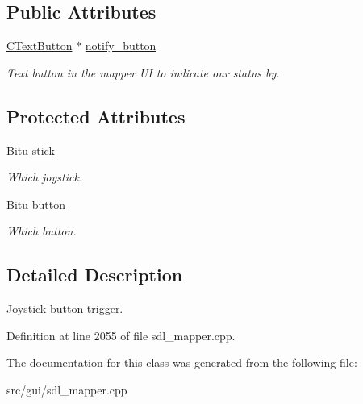 \subsection*{Public Attributes}
\begin{DoxyCompactItemize}
\item 
\hypertarget{classCJButtonEvent_ac8c89511fdc9a86b4c187eec432445d2}{\hyperlink{classCTextButton}{C\-Text\-Button} $\ast$ \hyperlink{classCJButtonEvent_ac8c89511fdc9a86b4c187eec432445d2}{notify\-\_\-button}}\label{classCJButtonEvent_ac8c89511fdc9a86b4c187eec432445d2}

\begin{DoxyCompactList}\small\item\em Text button in the mapper U\-I to indicate our status by. \end{DoxyCompactList}\end{DoxyCompactItemize}
\subsection*{Protected Attributes}
\begin{DoxyCompactItemize}
\item 
\hypertarget{classCJButtonEvent_aa87062af5d8bc5db801066e2eb4a74f8}{Bitu \hyperlink{classCJButtonEvent_aa87062af5d8bc5db801066e2eb4a74f8}{stick}}\label{classCJButtonEvent_aa87062af5d8bc5db801066e2eb4a74f8}

\begin{DoxyCompactList}\small\item\em Which joystick. \end{DoxyCompactList}\item 
\hypertarget{classCJButtonEvent_abdbfaa23915b89b1392129c9525dd58d}{Bitu \hyperlink{classCJButtonEvent_abdbfaa23915b89b1392129c9525dd58d}{button}}\label{classCJButtonEvent_abdbfaa23915b89b1392129c9525dd58d}

\begin{DoxyCompactList}\small\item\em Which button. \end{DoxyCompactList}\end{DoxyCompactItemize}


\subsection{Detailed Description}
Joystick button trigger. 

Definition at line 2055 of file sdl\-\_\-mapper.\-cpp.



The documentation for this class was generated from the following file\-:\begin{DoxyCompactItemize}
\item 
src/gui/sdl\-\_\-mapper.\-cpp\end{DoxyCompactItemize}
